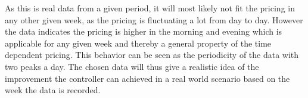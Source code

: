 As this is real data from a given period, it will most likely not fit the pricing in any other given week, as the pricing is fluctuating a lot from day to day. However the data indicates the pricing is higher in the morning and evening which is applicable for any given week and thereby a general property of the time dependent pricing. This behavior can be seen as the periodicity of the data with two peaks a day. The chosen data will thus give a realistic idea of the improvement the controller can achieved in a real world scenario based on the week the data is recorded.  


